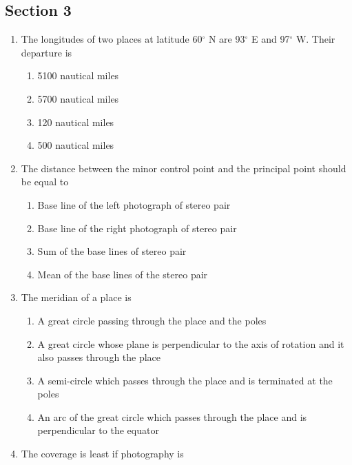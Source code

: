 \documentclass[11pt,a4paper]{article}
\begin{document}
\subsection*{Section 3}
\begin{enumerate}
\item{The longitudes of two places at latitude 60$^\circ$ N are 93$^\circ$ E and 97$^\circ$ W. Their departure is
}
\begin{enumerate}[label=\Alph*.]
\item{5100 nautical miles}
\item{5700 nautical miles}
\item{120 nautical miles}
\item{500 nautical miles}
\end{enumerate}
\item{The distance between the minor control point and the principal point should be equal to}
\begin{enumerate}[label=\Alph*.]
\item{Base line of the left photograph of stereo pair}
\item{Base line of the right photograph of stereo pair}
\item{Sum of the base lines of stereo pair}
\item{Mean of the base lines of the stereo pair}
\end{enumerate}
\item{The meridian of a place is}
\begin{enumerate}[label=\Alph*.]
\item{A great circle passing through the place and the poles}
\item{A great circle whose plane is perpendicular to the axis of rotation and it also passes through the place}
\item{A semi-circle which passes through the place and is terminated at the poles}
\item{An arc of the great circle which passes through the place and is perpendicular to the equator}
\end{enumerate}
\item{The coverage is least if photography is}
\\

\end{enumerate}
\end{document}
